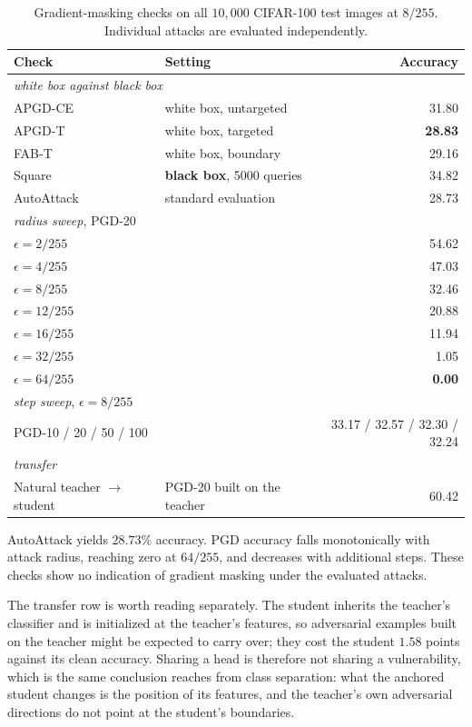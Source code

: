 \documentclass{article} %
\theoremstyle{plain}
\begin{document}
\begin{table}[!htbp]
  \centering \small \setlength{\tabcolsep}{5pt}
  \caption{Gradient-masking checks on all $10{,}000$ CIFAR-100 test images at $8/255$.
  Individual attacks are evaluated independently.}
  \label{tab:gradmask}
  \begin{tabular}{llr}
    \toprule
    Check & Setting & Accuracy \\
    \midrule
    \multicolumn{3}{l}{\emph{white box against black box}} \\
    APGD-CE            & white box, untargeted & 31.80 \\
    APGD-T             & white box, targeted   & \textbf{28.83} \\
    FAB-T              & white box, boundary   & 29.16 \\
    Square             & \textbf{black box}, 5000 queries & 34.82 \\
    \midrule
    AutoAttack & standard evaluation & 28.73 \\
    \midrule
    \multicolumn{3}{l}{\emph{radius sweep}, PGD-20} \\
    $\epsilon = 2/255$  & & 54.62 \\
    $\epsilon = 4/255$  & & 47.03 \\
    $\epsilon = 8/255$  & & 32.46 \\
    $\epsilon = 12/255$ & & 20.88 \\
    $\epsilon = 16/255$ & & 11.94 \\
    $\epsilon = 32/255$ & & 1.05 \\
    $\epsilon = 64/255$ & & \textbf{0.00} \\
    \midrule
    \multicolumn{3}{l}{\emph{step sweep}, $\epsilon = 8/255$} \\
    PGD-10 / 20 / 50 / 100 & & 33.17 / 32.57 / 32.30 / 32.24 \\
    \midrule
    \multicolumn{3}{l}{\emph{transfer}} \\
    Natural teacher $\rightarrow$ student & PGD-20 built on the teacher & 60.42 \\
    \bottomrule
  \end{tabular}
\end{table}

AutoAttack yields $28.73\%$ accuracy. PGD accuracy falls monotonically with attack radius, reaching
zero at $64/255$, and decreases with additional steps. These checks show no indication of gradient
masking under the evaluated attacks.

The transfer row is worth reading separately. The student inherits the teacher's classifier and is
initialized at the teacher's features, so adversarial examples built on the teacher might be expected
to carry over; they cost the student $1.58$ points against its clean accuracy. Sharing a head is
therefore not sharing a vulnerability, which is the same conclusion  reaches from
class separation: what the anchored student changes is the position of its features, and the teacher's own
adversarial directions do not point at the student's boundaries.
\end{document}
